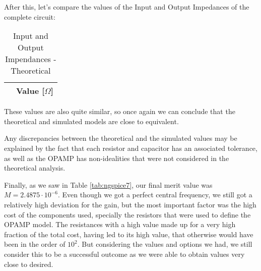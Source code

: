 After this, let's compare the values of the Input and Output Impedances of the complete circuit:

\FloatBarrier
\begin{table}[ht]
	\centering
	\begin{tabular}{|c|c|}
		\hline    
		& {\bf Value [$\Omega$]} \\ \hline
				
	\end{tabular}
	\caption{Input and Output Impendances - Theoretical}
	\label{tab:conc2}
\end{table}
\FloatBarrier

\FloatBarrier
\begin{table}[h]
	\centering
	\qquad
	\caption{Input and Output Impedance - Simulated}
	\label{tab:conc3}
\end{table}
\FloatBarrier

These values are also quite similar, so once again we can conclude that the theoretical and simulated models are close to equivalent. 

Any discrepancies between the theoretical and the simulated values may be explained by the fact that each resistor and capacitor has an associated tolerance, as well as the OPAMP has non-idealities that were not considered in the theoretical analysis.

Finally, as we saw in Table \ref{tab:ngspice7}, our final merit value was $M=2.4875\cdot10^{-6}$. Even though we got a perfect central frequency, we still got a relatively high deviation for the gain, but the most important factor was the high cost of the components used, specially the resistors that were used to define the OPAMP model. The resistances with a high value made up for a very high fraction of the total cost, having led to its high value, that otherwise would have been in the order of $10^{2}$. But considering the values and options we had, we still consider this to be a successful outcome as we were able to obtain values very close to desired.  


